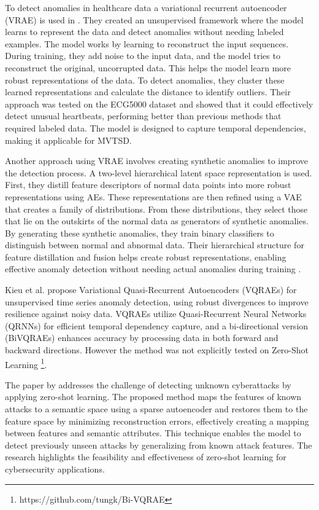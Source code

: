 To detect anomalies in healthcare data a variational recurrent autoencoder (VRAE) is used in \cite{pereira_learning_2019}. They created an unsupervised framework where the model learns to represent the data and detect anomalies without needing labeled examples.
The model works by learning to reconstruct the input sequences. During training, they add noise to the input data, and the model tries to reconstruct the original, uncorrupted data. This helps the model learn more robust representations of the data. To detect anomalies, they cluster these learned representations and calculate the distance to identify outliers. Their approach was tested on the ECG5000 dataset and showed that it could effectively detect unusual heartbeats, performing better than previous methods that required labeled data. The model is designed to capture temporal dependencies, making it applicable for MVTSD.

%
Another approach using VRAE involves creating synthetic anomalies to improve the detection process. A two-level hierarchical latent space representation is used. First, they distill feature descriptors of normal data points into more robust representations using AEs. These representations are then refined using a VAE that creates a family of distributions. From these distributions, they select those that lie on the outskirts of the normal data as generators of synthetic anomalies.
By generating these synthetic anomalies, they train binary classifiers to distinguish between normal and abnormal data. Their hierarchical structure for feature distillation and fusion helps create robust representations, enabling effective anomaly detection without needing actual anomalies during training \cite{ramirez_rivera_anomaly_2022}.

Kieu et al. propose Variational Quasi-Recurrent Autoencoders (VQRAEs) for unsupervised time series anomaly detection, using robust divergences to improve resilience against noisy data. VQRAEs utilize Quasi-Recurrent Neural Networks (QRNNs) for efficient temporal dependency capture, and a bi-directional version (BiVQRAEs) enhances accuracy by processing data in both forward and backward directions. However the method was not explicitly tested on Zero-Shot Learning \cite{kieu_anomaly_2022} \footnote{\fussy\tiny https://github.com/tungk/Bi-VQRAE}.


The paper by \cite{zhang_unknown_2020} addresses the challenge of detecting unknown cyberattacks by applying zero-shot learning. The proposed method maps the features of known attacks to a semantic space using a sparse autoencoder and restores them to the feature space by minimizing reconstruction errors, effectively creating a mapping between features and semantic attributes. This technique enables the model to detect previously unseen attacks by generalizing from known attack features. The research highlights the feasibility and effectiveness of zero-shot learning for cybersecurity applications.


